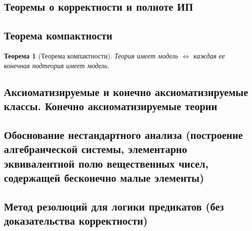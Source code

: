 \documentclass[a4paper]{article}
\newtheorem{theorem}{Теорема}[section]
\theoremstyle{definition}
\theoremstyle{remark}
\begin{document}
    \subsection{Теоремы о корректности и полноте ИП}
    \subsection{Теорема компактности}
    \begin{theorem}[Теорема компактности]
        Теория имеет модель $\Leftrightarrow$ каждая ее конечная подтеория имеет модель. 
    \end{theorem}
    \subsection{Аксиоматизируемые и конечно аксиоматизируемые классы. Конечно аксиоматизируемые теории}
    \subsection{Обоснование нестандартного анализа (построение алгебраической системы, элементарно эквивалентной полю вещественных чисел, содержащей бесконечно малые элементы)}
    \subsection{Метод резолюций для логики предикатов (без доказательства корректности)}


\end{document}
